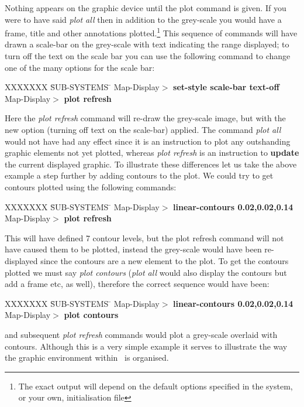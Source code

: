Nothing appears on the graphic device until the plot command is given. 
If you were to have said {\em plot all} then in addition to the grey-scale
you would have a frame, title and other annotations plotted.\footnote{The
exact output will depend on the default options specified in the system,
or your own, initialisation file}  This sequence of commands will have
drawn a scale-bar on the grey-scale with text indicating the range displayed;
to turn off the text on the scale bar you can use the following command
to change one of the many options for the scale bar:
\begin{tabbing}
XXXXXXX \= SUB-SYSTEMS \= \kill
\> Map-Display$>$ \> {\bf set-style scale-bar text-off} \\
\> Map-Display$>$ \> {\bf plot refresh} \\
\end{tabbing}
Here the {\em plot refresh} command will re-draw the grey-scale image,
but with the new option (turning off text on the scale-bar) applied. 
The command {\em plot all} would not have had any effect since it is
an instruction to plot any outshanding graphic elements not yet plotted,
whereas {\em plot refresh} is an instruction to {\bf update} the current
displayed graphic.  To illustrate these differences let us take the 
above example a step further by adding contours to the plot.  We could
try to get contours plotted using the following commands:
\begin{tabbing}
XXXXXXX \= SUB-SYSTEMS \= \kill
\> Map-Display$>$ \> {\bf linear-contours 0.02,0.02,0.14} \\
\> Map-Display$>$ \> {\bf plot refresh} \\
\end{tabbing}
This will have defined 7 contour levels, but the {plot refresh}
command will not have caused them to be plotted, instead the grey-scale
would have been re-displayed since the contours are a new element to the
plot.  To get the contours plotted we must say {\em plot contours}
({\em plot all} would also display the contours but add a frame etc, as well),
therefore the correct sequence would have been:
\begin{tabbing}
XXXXXXX \= SUB-SYSTEMS \= \kill
\> Map-Display$>$ \> {\bf linear-contours 0.02,0.02,0.14} \\
\> Map-Display$>$ \> {\bf plot contours} \\
\end{tabbing}
and subsequent {\em plot refresh} commands would plot a grey-scale
overlaid with contours.  Although this is a very simple example it
serves to illustrate the way the graphic environment within \Anmap\
is organised.

